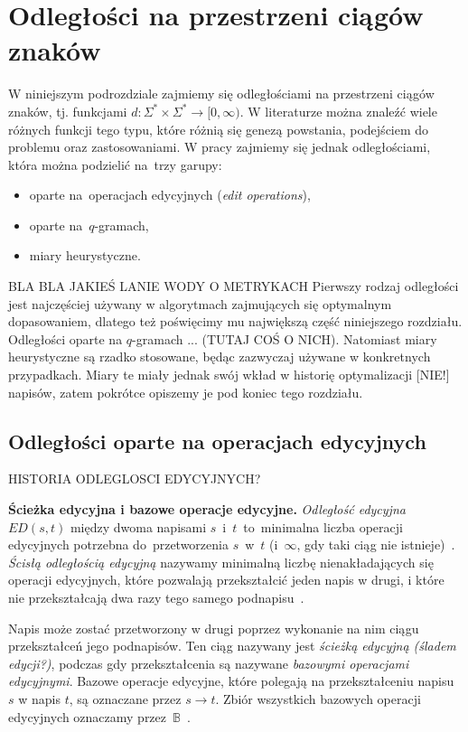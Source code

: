\documentclass{praca1}
\begin{document}
\section{Odległości na przestrzeni ciągów znaków}

W niniejszym podrozdziale zajmiemy się odległościami na przestrzeni ciągów znaków, tj. funkcjami $d: \Sigma^* \times \Sigma^* \rightarrow [0, \infty)$. W literaturze można znaleźć wiele różnych funkcji tego typu, które różnią się genezą powstania, podejściem do problemu oraz zastosowaniami. W pracy zajmiemy się jednak odległościami, która można podzielić na~trzy garupy:
\begin{itemize}
\item oparte na~operacjach edycyjnych (\emph{edit operations}),
\item oparte na~$q$-gramach,
\item miary heurystyczne.
\end{itemize}

BLA BLA JAKIEŚ LANIE WODY O METRYKACH
Pierwszy rodzaj odległości jest najczęściej używany w algorytmach zajmujących się optymalnym dopasowaniem, dlatego też poświęcimy mu największą część niniejszego rozdziału. Odległości oparte na $q$-gramach ... (TUTAJ COŚ O NICH). Natomiast miary heurystyczne są rzadko stosowane, będąc zazwyczaj używane w konkretnych przypadkach. Miary te miały jednak swój wkład w historię optymalizacji [NIE!] napisów, zatem pokrótce opiszemy je pod koniec tego rozdziału.

\subsection{Odległości oparte na operacjach edycyjnych}

HISTORIA ODLEGLOSCI EDYCYJNYCH?

\textbf{Ścieżka edycyjna i bazowe operacje edycyjne.} \emph{Odległość edycyjna} $ED(s,t)$ między dwoma napisami $s$~i~$t$~to~minimalna liczba operacji edycyjnych potrzebna do~przetworzenia $s$~w~$t$ (i~$\infty$, gdy taki ciąg nie istnieje)~\cite{Navarro2001:guidedtour}. \emph{Ścisłą odległością edycyjną} nazywamy minimalną liczbę nienakładających się operacji edycyjnych, które pozwalają przekształcić jeden napis w drugi, i które nie przekształcają dwa razy tego samego podnapisu~\cite{Boytsov2011:indexingmethods}.

Napis może zostać przetworzony w drugi poprzez wykonanie na nim ciągu przekształceń jego podnapisów. Ten ciąg nazywany jest \emph{ścieżką edycyjną (śladem edycji?)}, podczas gdy przekształcenia są nazywane \emph{bazowymi operacjami edycyjnymi}. Bazowe operacje edycyjne, które polegają na przekształceniu napisu $s$ w napis $t$, są oznaczane przez $s \rightarrow t$. Zbiór wszystkich bazowych operacji edycyjnych oznaczamy przez~$\mathbb{B}$~\cite{Boytsov2011:indexingmethods}.
\end{document}
